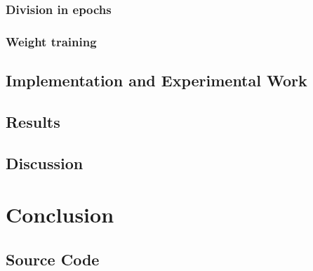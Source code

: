 \documentclass[11pt,a4paper]{report}
\begin{document}
			\subsection{Division in epochs}
			\subsection{Weight training}
			
		\section{Implementation and Experimental Work}
			
		\section{Results}
		\section{Discussion}
		
	\chapter{Conclusion}
	
	
	
	\nocite{*}
	
	\begin{appendices}
		\chapter{Source Code}
	\end{appendices}
\end{document}
